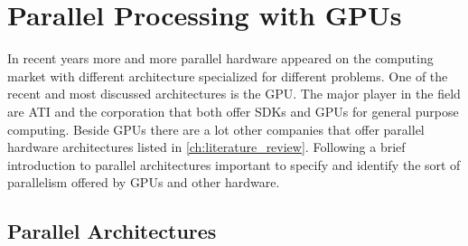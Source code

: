 

\chapter{Parallel Processing with GPUs}%
\label{cha:parallel_processing_with_gpu} 

In recent years more and more parallel hardware appeared on the computing market
with different architecture specialized for different problems. One of the recent
and most discussed architectures is the \gls{GPU}. The major player in the field
are  \gls{ATI} and the  corporation that both offer 
\glspl{SDK} and \glspl{GPU} for general purpose computing. Beside \glspl{GPU} there
are a lot other companies that offer parallel hardware architectures listed in 
\autoref{ch:literature_review}. Following a brief introduction to parallel
 architectures important to specify and identify the sort of parallelism offered
by \glspl{GPU} and other hardware.

\section{Parallel Architectures}
\label{sec:parallel_architectures} 

